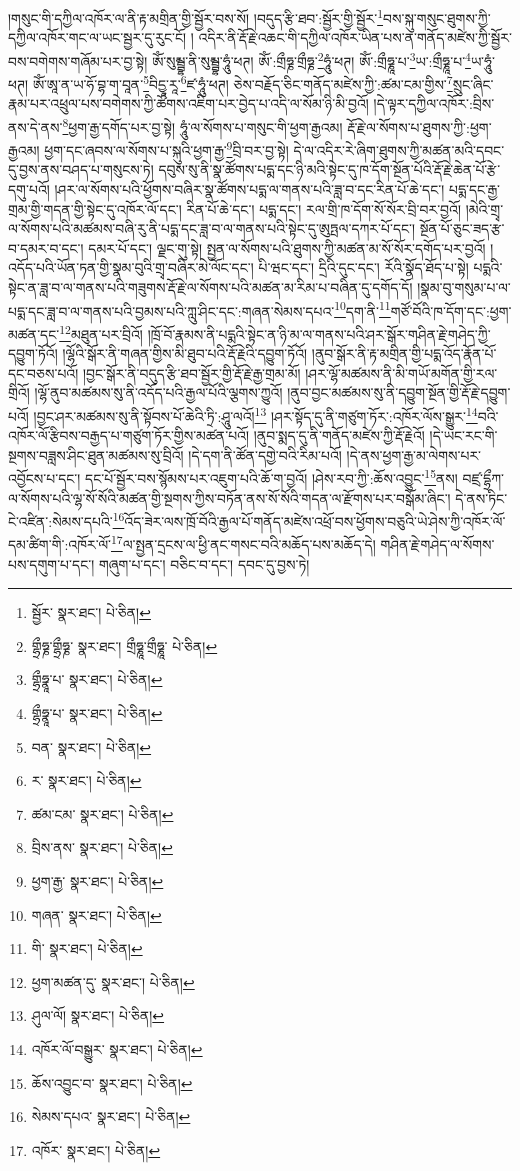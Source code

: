 །གསུང་གི་དཀྱིལ་འཁོར་ལ་ནི་རྟ་མགྲིན་གྱི་སྦྱོར་བས་སོ། །བདུད་རྩི་ཐབ་:སྦྱོར་གྱི་སྦྱོར་\footnote{སྦྱོར་  སྣར་ཐང་།  པེ་ཅིན། }བས་སྐུ་གསུང་ཐུགས་ཀྱི་དཀྱིལ་འཁོར་གང་ལ་ཡང་སྦྱར་དུ་རུང་ངོ། །
འདིར་ནི་རྡོ་རྗེ་འཆང་གི་དཀྱིལ་འཁོར་ཡིན་པས་ན་གནོད་མཛེས་ཀྱི་སྦྱོར་བས་བགེགས་གཞོམ་པར་བྱ་སྟེ། ཨོཾ་སུམྦྷ་ནི་སུམྦྷ་ཧཱུཾ་ཕཊ། ཨོཾ་:གྲྀཧྞ་གྲྀཧྞ་\footnote{གྷྲྀཧྞ་གྷྲྀཧྞ་  སྣར་ཐང་། གྲྀཧྞཱ་གྲྀཧྞཱ་  པེ་ཅིན། }ཧཱུཾ་ཕཊ། ཨོཾ་:གྲྀཧྞཱ་པ་\footnote{གྷྲྀཧྣཱ་པ་  སྣར་ཐང་།  པེ་ཅིན། }ཡ་:གྲྀཧྞཱ་པ་\footnote{གྷྲྀཧྣཱ་པ་  སྣར་ཐང་།  པེ་ཅིན། }ཡ་ཧཱུཾ་ཕཊ། ཨོཾ་ཨཱ་ན་ཡ་ཧོ་བྷ་ག་བཱན་\footnote{བན་  སྣར་ཐང་།  པེ་ཅིན། }བིདྱཱ་རཱ་\footnote{ར་  སྣར་ཐང་།  པེ་ཅིན། }ཛ་ཧཱུཾ་ཕཊ། ཅེས་བརྗོད་ཅིང་གནོད་མཛེས་ཀྱི་:ཚམ་ངམ་གྱིས་\footnote{ཚམ་ངམ་  སྣར་ཐང་།  པེ་ཅིན། }སྲུང་ཞིང་རྣམ་པར་འཕྲུལ་པས་བགེགས་ཀྱི་ཚོགས་འཇིག་པར་བྱེད་པ་འདི་ལ་སོམ་ཉི་མི་བྱའོ། །དེ་ལྟར་དཀྱིལ་འཁོར་:བྲིས་ནས་དེ་ནས་\footnote{བྲིས་ནས་  སྣར་ཐང་།  པེ་ཅིན། }ཕྱག་རྒྱ་དགོད་པར་བྱ་སྟེ། ཧཱུཾ་ལ་སོགས་པ་གསུང་གི་ཕྱག་རྒྱའམ། རྡོ་རྗེ་ལ་སོགས་པ་ཐུགས་ཀྱི་:ཕྱག་རྒྱའམ། ཕྱག་དང་ཞབས་ལ་སོགས་པ་སྐུའི་ཕྱག་རྒྱ་\footnote{ཕྱག་རྒྱ་  སྣར་ཐང་།  པེ་ཅིན། }བྲི་བར་བྱ་སྟེ། དེ་ལ་འདིར་རེ་ཞིག་ཐུགས་ཀྱི་མཚན་མའི་དབང་དུ་བྱས་ནས་བཤད་པ་གསུངས་ཏེ། དབུས་སུ་ནི་སྣ་ཚོགས་པདྨ་དང་ཉི་མའི་སྟེང་དུ་ཁ་དོག་སྔོན་པོའི་རྡོ་རྗེ་ཆེན་པོ་རྩེ་དགུ་པའོ། །ཤར་ལ་སོགས་པའི་ཕྱོགས་བཞིར་སྣ་ཚོགས་པདྨ་ལ་གནས་པའི་ཟླ་བ་དང་རིན་པོ་ཆེ་དང་། པདྨ་དང་རྒྱ་གྲམ་གྱི་གདན་གྱི་སྟེང་དུ་འཁོར་ལོ་དང་། རིན་པོ་ཆེ་དང་། པདྨ་དང་། རལ་གྲི་ཁ་དོག་སོ་སོར་བྲི་བར་བྱའོ། །མེའི་གྲྭ་ལ་སོགས་པའི་མཚམས་བཞི་རུ་ནི་པདྨ་དང་ཟླ་བ་ལ་གནས་པའི་སྟེང་དུ་ཨུཏྤལ་དཀར་པོ་དང་། སྔོན་པོ་ཅུང་ཟད་རྩ་བ་དམར་བ་དང་། དམར་པོ་དང་། ལྗང་གུ་སྟེ། སྤྱན་ལ་སོགས་པའི་ཐུགས་ཀྱི་མཚན་མ་སོ་སོར་དགོད་པར་བྱའོ། །འདོད་པའི་ཡོན་ཏན་གྱི་སྣམ་བུའི་གྲྭ་བཞིར་མེ་ལོང་དང་། པི་ཝང་དང་། དྲིའི་དུང་དང་། རོའི་སྣོད་ཐོད་པ་སྟེ། པདྨའི་སྟེང་ན་ཟླ་བ་ལ་གནས་པའི་གཟུགས་རྡོ་རྗེ་ལ་སོགས་པའི་མཚན་མ་རིམ་པ་བཞིན་དུ་དགོད་དོ། །སྣམ་བུ་གསུམ་པ་ལ་པདྨ་དང་ཟླ་བ་ལ་གནས་པའི་བྱམས་པའི་ཀླུ་ཤིང་དང་:གཞན་སེམས་དཔའ་\footnote{གཞན་  སྣར་ཐང་།  པེ་ཅིན། }དག་ནི་\footnote{གི་  སྣར་ཐང་།  པེ་ཅིན། }གཙོ་བོའི་ཁ་དོག་དང་:ཕྱག་མཚན་དང་\footnote{ཕྱག་མཚན་དུ་  སྣར་ཐང་།  པེ་ཅིན། }མཐུན་པར་བྲིའོ། །ཁྲོ་བོ་རྣམས་ནི་པདྨའི་སྟེང་ན་ཉི་མ་ལ་གནས་པའི་ཤར་སྒོར་གཤིན་རྗེ་གཤེད་ཀྱི་དབྱུག་ཏོའོ། །ལྷོའི་སྒོར་ནི་གཞན་གྱིས་མི་ཐུབ་པའི་རྡོ་རྗེའི་དབྱུག་ཏོའོ། །ནུབ་སྒོར་ནི་རྟ་མགྲིན་གྱི་པདྨ་འོད་རྣོན་པོ་དང་བཅས་པའོ། །བྱང་སྒོར་ནི་བདུད་རྩི་ཐབ་སྦྱོར་གྱི་རྡོ་རྗེ་རྒྱ་གྲམ་མོ། །ཤར་ལྷོ་མཚམས་ནི་མི་གཡོ་མགོན་གྱི་རལ་གྲིའོ། །ལྷོ་ནུབ་མཚམས་སུ་ནི་འདོད་པའི་རྒྱལ་པོའི་ལྕགས་ཀྱུའོ། །ནུབ་བྱང་མཚམས་སུ་ནི་དབྱུག་སྔོན་གྱི་རྡོ་རྗེ་དབྱུག་པའོ། །བྱང་ཤར་མཚམས་སུ་ནི་སྟོབས་པོ་ཆེའི་ཏྲི་:ཤཱུ་ལའོ།\footnote{ཤུལ་ལོ།  སྣར་ཐང་།  པེ་ཅིན། } །ཤར་སྟོད་དུ་ནི་གཙུག་ཏོར་:འཁོར་ལོས་སྒྱུར་\footnote{འཁོར་ལོ་བསྒྱུར་  སྣར་ཐང་།  པེ་ཅིན། }བའི་འཁོར་ལོ་རྩིབས་བརྒྱད་པ་གཙུག་ཏོར་གྱིས་མཚན་པའོ། །ནུབ་སྨད་དུ་ནི་གནོད་མཛེས་ཀྱི་རྡོ་རྗེའོ། །དེ་ཡང་རང་གི་སྔགས་བཟླས་ཤིང་ཐུན་མཚམས་སུ་བྲིའོ། །དེ་དག་ནི་ཚོན་དགྱེ་བའི་རིམ་པའོ། །དེ་ནས་ཕྱག་རྒྱ་མ་ལེགས་པར་འབྱོངས་པ་དང་། དང་པོ་སྦྱོར་བས་སྙོམས་པར་འཇུག་པའི་ཆོ་ག་བྱའོ། །ཤེས་རབ་ཀྱི་:ཆོས་འབྱུང་\footnote{ཆོས་འབྱུང་བ་  སྣར་ཐང་།  པེ་ཅིན། }ནས། བཛྲ་དྷྲྀཀ་ལ་སོགས་པའི་ལྷ་སོ་སོའི་མཚན་གྱི་སྔགས་ཀྱིས་བཏོན་ནས་སོ་སོའི་གདན་ལ་རྫོགས་པར་བསྒོམ་ཞིང་། དེ་ནས་ཏིང་ངེ་འཛིན་:སེམས་དཔའི་\footnote{སེམས་དཔའ་  སྣར་ཐང་།  པེ་ཅིན། }འོད་ཟེར་ལས་ཁྲོ་བོའི་རྒྱལ་པོ་གནོད་མཛེས་འཕྲོ་བས་ཕྱོགས་བཅུའི་ཡེ་ཤེས་ཀྱི་འཁོར་ལོ་དམ་ཚིག་གི་:འཁོར་ལོ་\footnote{འཁོར་  སྣར་ཐང་།  པེ་ཅིན། }ལ་སྤྱན་དྲངས་ལ་ཕྱི་ནང་གསང་བའི་མཆོད་པས་མཆོད་དེ། གཤིན་རྗེ་གཤེད་ལ་སོགས་པས་དགུག་པ་དང་། གཞུག་པ་དང་། བཅིང་བ་དང་། དབང་དུ་བྱས་ཏེ། 
